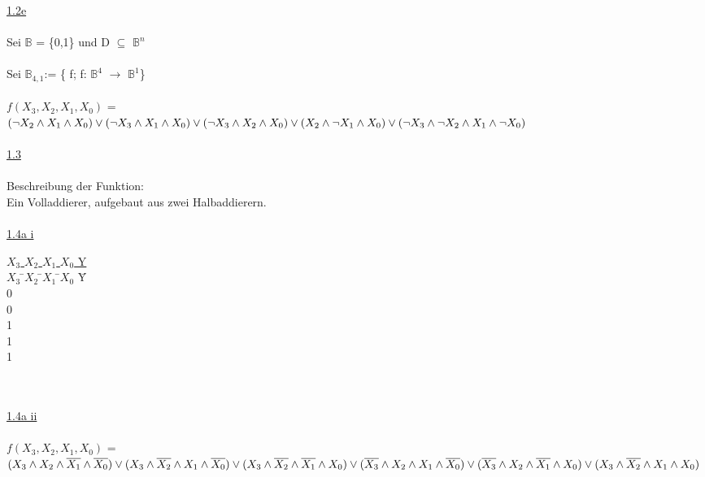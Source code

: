 \documentclass[a4paper,10pt]{scrartcl}
\begin{document}
\underline{1.2e}\\\\
Sei $\mathbb{B}$ = \{0,1\} und D $\subseteq$ $\mathbb{B}^n$\\\\
Sei $\mathbb{B}_{4,1}$:= \{ f; f: $\mathbb{B}^4$ $\rightarrow$ $\mathbb{B}^1$\}\\\\
$f(X_{3},X_{2},X_{1},X_{0})$ = \\\( (\lnot X_{2} \land X_{1} \land X_{0}) \lor (\lnot X_{3} \land X_{1} \land X_{0}) \lor (\lnot X_{3} \land X_{2} \land X_{0}) \lor (X_{2} \land \lnot X_{1} \land X_{0}) \\\lor (\lnot X_{3} \land \lnot X_{2} \land X_{1} \land \lnot X_{0})\)\\\\
\newpage
\noindent
\underline{1.3}\\\\
Beschreibung der Funktion:\\
Ein Volladdierer, aufgebaut aus zwei Halbaddierern.\\\\
\underline{1.4a i}
\begin{tabbing}
\underline{$X_{3}$ $X_{2}$ $X_{1}$ $X_{0}$ Y} \\
$X_{3}$ \=$X_{2}$ \=$X_{1}$ \=$X_{0}$ \=Y     \\
0    \\
0    \\
1    \\
1    \\
1    \\\\\\
\end{tabbing}
\underline{1.4a ii}\\\\
 $f(X_{3},X_{2},X_{1},X_{0})$ = \\ \((X_{3} \land X_{2} \land \overline{X_{1}} \land \overline{X_{0}}) \lor  (X_{3} \land \overline{X_{2}} \land X_{1} \land \overline{X_{0}}) \lor (X_{3} \land \overline{X_{2}} \land \overline{X_{1}} \land X_{0}) \lor\\ (\overline{X_{3}} \land X_{2} \land X_{1} \land \overline{X_{0}}) \lor (\overline{X_{3}} \land X_{2} \land \overline{X_{1}} \land X_{0}) \lor (X_{3} \land \overline{X_{2}} \land X_{1} \land X_{0})\)
\end{document}
